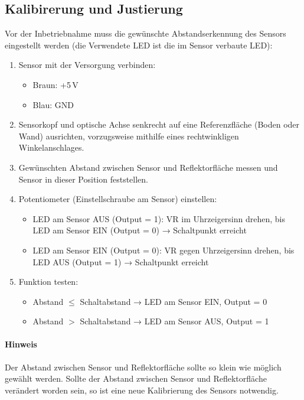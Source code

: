 \subsection{Kalibirerung und Justierung}


Vor der Inbetriebnahme muss die gewünschte Abstandserkennung des Sensors eingestellt werden (die Verwendete LED ist die im Sensor verbaute LED):

\begin{enumerate}
	\item Sensor mit der Versorgung verbinden:
	\begin{itemize}
		\item Braun: +5\,V
		\item Blau: GND
	\end{itemize}
	
	\item Sensorkopf und optische Achse  senkrecht auf eine Referenzfläche (Boden oder Wand) ausrichten, vorzugsweise mithilfe eines rechtwinkligen Winkelanschlages.
	\item Gewünschten Abstand zwischen Sensor und Reflektorfläche messen und Sensor in dieser Position feststellen. 
	\item Potentiometer (Einstellschraube am Sensor) einstellen:
	\begin{itemize}
		\item LED am Sensor AUS (Output = 1): VR im Uhrzeigersinn drehen, bis LED am Sensor EIN (Output = 0) → Schaltpunkt erreicht
		\item LED am Sensor EIN (Output = 0): VR gegen Uhrzeigersinn drehen, bis LED AUS (Output = 1) → Schaltpunkt erreicht
	\end{itemize}

	\item Funktion testen:
	\begin{itemize}
		\item Abstand $\leq$ Schaltabstand → LED  am Sensor EIN, Output = 0
		\item Abstand $>$ Schaltabstand → LED am Sensor AUS, Output = 1
	\end{itemize}
\end{enumerate}

\paragraph{Hinweis}
Der Abstand zwischen Sensor und Reflektorfläche sollte so klein wie möglich gewählt werden. 
Sollte der Abstand zwischen Sensor und Reflektorfläche verändert worden sein, so ist eine neue Kalibrierung des Sensors notwendig.


